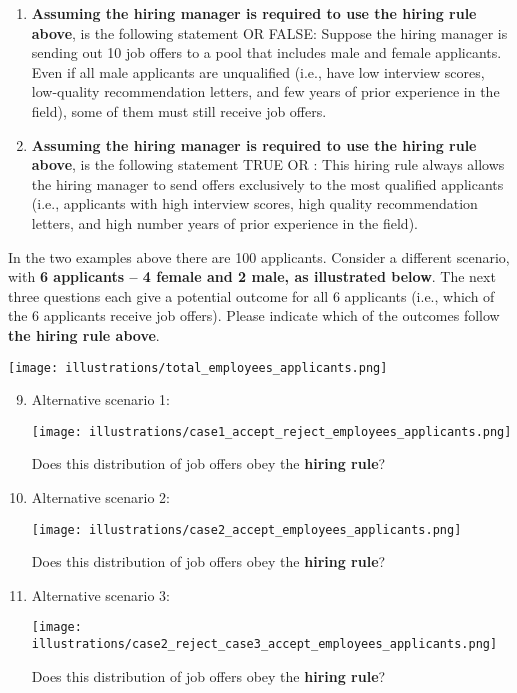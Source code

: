 \documentclass{article}
\newcommand{\correct}[1]{{\color{red}{#1}}}
\newcommand{\correct}[1]{{\color{red}{#1}}}
\begin{document}
\begin{enumerate}
    \item \textbf{Assuming the hiring manager is required to use the hiring rule above}, is the following statement \correct{TRUE} OR FALSE: Suppose the hiring manager is sending out 10 job offers to a pool that includes male and female applicants. Even if all male applicants are unqualified (i.e., have low interview scores, low-quality recommendation letters, and few years of prior experience in the field), some of them must still receive job offers.
    \item \textbf{Assuming the hiring manager is required to use the hiring rule above}, is the following statement TRUE OR \correct{FALSE}: This hiring rule always allows the hiring manager to send offers exclusively to the most qualified applicants (i.e., applicants with high interview scores, high quality recommendation letters, and high number years of prior experience in the field).
\end{enumerate}

In the two examples above there are 100 applicants. Consider a different scenario, with \textbf{6 applicants -- 4 female and 2 male, as illustrated below}. The next three questions each give a potential outcome for all 6 applicants (i.e., which of the 6 applicants receive job offers). Please indicate which of the outcomes follow \textbf{the hiring rule above}.

\vspace{10pt}
\texttt{[image: illustrations/total\_employees\_applicants.png]}

\begin{enumerate}
    \setcounter{enumi}{8}
    \item Alternative scenario 1:
    
    \vspace{10pt}
    \texttt{[image: illustrations/case1\_accept\_reject\_employees\_applicants.png]}
    
    Does this distribution of job offers obey the \textbf{hiring rule}? \correct{Yes}
    \item Alternative scenario 2:
    
    \vspace{10pt}
    \texttt{[image: illustrations/case2\_accept\_employees\_applicants.png]}
    
    Does this distribution of job offers obey the \textbf{hiring rule}? \correct{No}
    \item Alternative scenario 3:
    
    \vspace{10pt}
    \texttt{[image: illustrations/case2\_reject\_case3\_accept\_employees\_applicants.png]}
    
    Does this distribution of job offers obey the \textbf{hiring rule}? \correct{No}
\end{enumerate}
\end{document}
